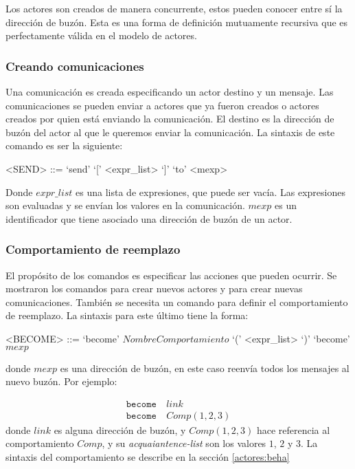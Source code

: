 Los actores son creados de manera concurrente, estos pueden conocer entre sí la dirección de buzón. Esta es una forma de definición mutuamente recursiva que es perfectamente válida en el modelo de actores. 


\subsubsection*{Creando comunicaciones}
Una comunicación es creada especificando un actor destino y un mensaje. Las comunicaciones se pueden enviar a actores que ya fueron creados o actores creados por quien está enviando la comunicación. El destino es la dirección de buzón del actor al que le queremos enviar la comunicación. La sintaxis de este comando es ser la siguiente:

\begin{grammar}
  <SEND> ::= `send' `[' <expr_list> `]' `to' <mexp>  
\end{grammar}

Donde $expr\_list$ es una lista de expresiones, que puede ser vacía. Las expresiones son evaluadas y se envían los valores en la comunicación. $mexp$ es un identificador que tiene asociado una dirección de buzón de un actor. 

\subsubsection*{Comportamiento de reemplazo}

El propósito de los comandos es especificar las acciones que pueden ocurrir. Se mostraron los comandos para crear nuevos actores y para crear nuevas comunicaciones. También se necesita un comando para definir el comportamiento de reemplazo. La sintaxis para este último tiene la forma:

\begin{grammar}
  <BECOME> ::= `become' $NombreComportamiento$ `(' <expr_list> `)'
  \alt `become' $mexp$
\end{grammar}

donde $mexp$ es una dirección de buzón, en este caso reenvía todos los mensajes al nuevo buzón.  Por ejemplo:

\begin{align*}
 \texttt{become}&\ link \\
 \texttt{become}&\ Comp(1,2,3) 
\end{align*}
donde $link$ es alguna dirección de buzón, y $Comp(1,2,3)$ hace referencia al comportamiento $Comp$, y su \textit{acquaiantence-list} son los valores $1$, $2$ y $3$. La sintaxis del comportamiento se describe en la sección \ref{actores:beha}

